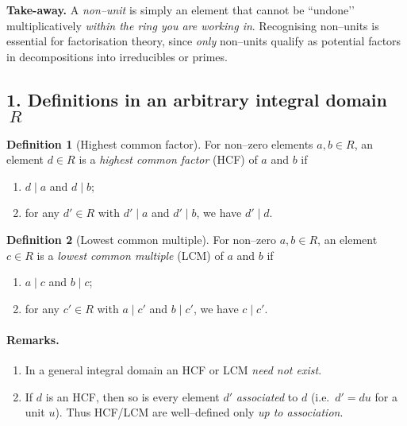 \documentclass[12pt]{article}
\theoremstyle{definition} %
\newtheorem{definition}{Definition}
\theoremstyle{plain} %
\begin{document}
\bigskip
\noindent
\textbf{Take-away.}  
A \emph{non–unit} is simply an element that cannot be “undone’’
multiplicatively \emph{within the ring you are working in}.  
Recognising non–units is essential for factorisation theory, since
\emph{only} non–units qualify as potential factors in decompositions
into irreducibles or primes.
\subsection*{1.  Definitions in an arbitrary integral domain \(\,R\)}

\begin{definition}[Highest common factor]
  For non–zero elements \(a,b\in R\), an element \(d\in R\) is a
  \emph{highest common factor} (HCF) of \(a\) and \(b\) if
  \begin{enumerate}
    \item \(d\mid a\) and \(d\mid b\);
    \item for any \(d'\in R\) with \(d'\mid a\) and \(d'\mid b\), we have \(d'\mid d\).
  \end{enumerate}
\end{definition}

\begin{definition}[Lowest common multiple]
  For non–zero \(a,b\in R\), an element \(c\in R\) is a
  \emph{lowest common multiple} (LCM) of \(a\) and \(b\) if
  \begin{enumerate}
    \item \(a\mid c\) and \(b\mid c\);
    \item for any \(c'\in R\) with \(a\mid c'\) and \(b\mid c'\), we have \(c\mid c'\).
  \end{enumerate}
\end{definition}

\paragraph{Remarks.}
\begin{enumerate}
  \item In a general integral domain an HCF or LCM \emph{need not exist}.
  \item If \(d\) is an HCF, then so is every element \(d'\) \emph{associated} to \(d\)
        (i.e.\ \(d'=du\) for a unit \(u\)).  
        Thus HCF/LCM are well–defined only \emph{up to association}.
\end{enumerate}
\end{document}
